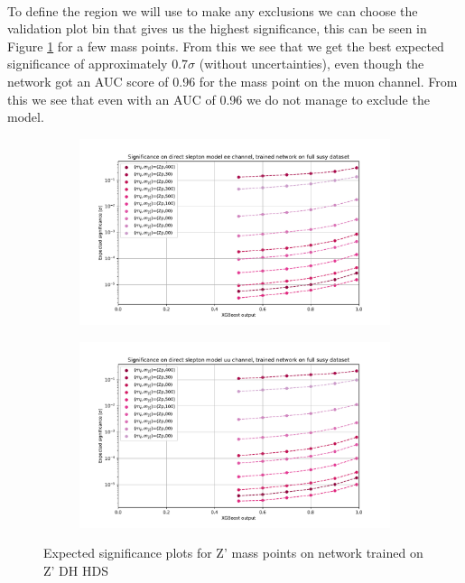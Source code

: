 \documentclass[12pt, a4paper]{book}
\begin{document}
\\To define the region we will use to make any exclusions we can choose the validation plot bin that gives us the highest significance, this can be seen in Figure \ref{fig:DH_HDS_exp_sig} for a few mass points. From this we see that we get the best expected significance 
of approximately 0.7$\sigma$ (without uncertainties), even though the network got an AUC score of 0.96 for the mass point on the muon channel. From this we see that even with an AUC of 0.96 we do not manage to exclude the model.\\
\begin{figure}[!ht]
	\centering
	\begin{subfigure}[b]{0.49\textwidth}
      \centering
      \includegraphics[width=1\textwidth]{XGBoost/DH_HDS/EXP_SIG_ee.pdf}
      \end{subfigure}
   \hfill
   \begin{subfigure}[b]{0.49\textwidth}
      \centering
      \includegraphics[width=1\textwidth]{XGBoost/DH_HDS/EXP_SIG_uu.pdf}
      \end{subfigure}
   \caption{Expected significance plots for Z' mass points on network trained on Z' DH HDS}\label{fig:DH_HDS_exp_sig}
\end{figure}
\end{document}
